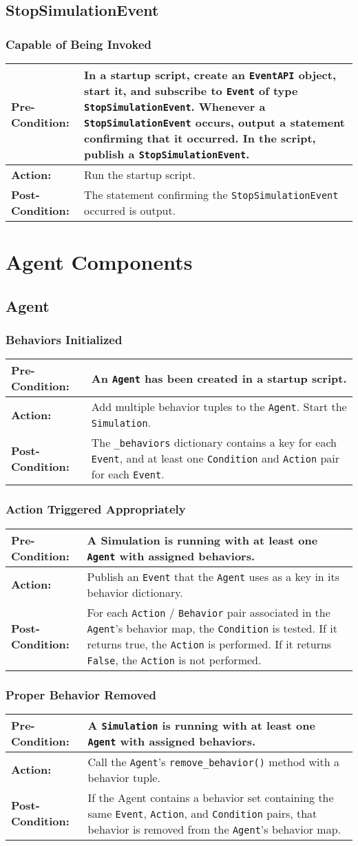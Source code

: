\documentclass[titlepage]{article}
\newcommand{\testcase}[3]{
    \begin{center}
    \begin{tabular}{| l | p{0.7\textwidth}|}
        \hline
        \rowcolor[gray]{0.8}\textbf{Pre-Condition:} & #1 \\ \hline
        \textbf{Action:} & #2 \\ \hline
        \rowcolor[gray]{0.8}\textbf{Post-Condition:} & #3 \\ \hline
    \end{tabular}
    \end{center}
}
\begin{document}
\subsection{StopSimulationEvent}
\subsubsection{Capable of Being Invoked}
\testcase{In a startup script, create an \texttt{EventAPI} object, start it, and subscribe to \texttt{Event} of type \texttt{StopSimulationEvent}. Whenever a \texttt{StopSimulationEvent} occurs, output a statement confirming that it occurred. In the script, publish a \texttt{StopSimulationEvent}.}{Run the startup script.}{The statement confirming the \texttt{StopSimulationEvent} occurred is output.}

\section{Agent Components}
\subsection{Agent}
\subsubsection{Behaviors Initialized}
\testcase{An \texttt{Agent} has been created in a startup script.}{Add multiple behavior tuples to the \texttt{Agent}. Start the \texttt{Simulation}.}{The \texttt{\_behaviors} dictionary contains a key for each \texttt{Event}, and at least one \texttt{Condition} and \texttt{Action} pair for each \texttt{Event}.}

\subsubsection{Action Triggered Appropriately}
\testcase{A Simulation is running with at least one \texttt{Agent} with assigned behaviors.}{Publish an \texttt{Event} that the \texttt{Agent} uses as a key in its behavior dictionary.}{For each \texttt{Action} / \texttt{Behavior} pair associated in the \texttt{Agent}'s behavior map, the \texttt{Condition} is tested.  If it returns true, the \texttt{Action} is performed.  If it returns \texttt{False}, the \texttt{Action} is not performed.}

\subsubsection{Proper Behavior Removed}
\testcase{A \texttt{Simulation} is running with at least one \texttt{Agent} with assigned behaviors.}{Call the \texttt{Agent}'s \texttt{remove\_behavior()} method with a behavior tuple.}{If the Agent contains a behavior set containing the same \texttt{Event}, \texttt{Action}, and \texttt{Condition} pairs, that behavior is removed from the \texttt{Agent}'s behavior map.}
\end{document}
